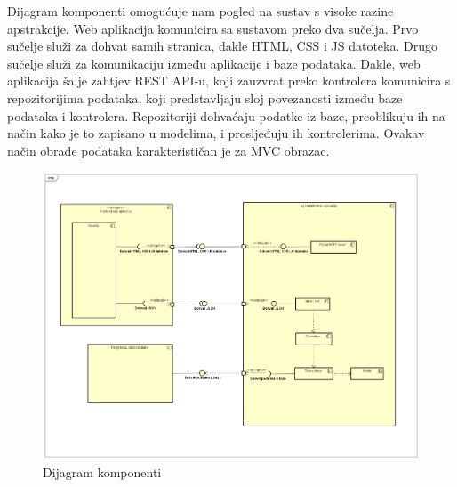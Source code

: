 		    Dijagram komponenti omogućuje nam pogled na sustav s visoke razine apstrakcije. Web aplikacija komunicira sa sustavom preko dva sučelja. Prvo sučelje služi za dohvat samih stranica, dakle HTML, CSS i JS datoteka. Drugo sučelje služi za komunikaciju između aplikacije i baze podataka. Dakle, web aplikacija šalje zahtjev REST API-u, koji zauzvrat preko kontrolera komunicira s repozitorijima podataka, koji predstavljaju sloj povezanosti između baze podataka i kontrolera. Repozitoriji dohvaćaju podatke iz baze, preoblikuju ih na način kako je to zapisano u modelima, i prosljeđuju ih kontrolerima. Ovakav način obrade podataka karakterističan je za MVC obrazac. 	
            \begin{figure}[H]
				\includegraphics[width=\textwidth]{slike/dijagram_komponenti.png}
				\centering
				\caption{Dijagram komponenti}
				\label{fig:classd_middle}
			\end{figure}
